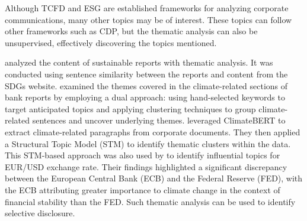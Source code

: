 Although TCFD and ESG are established frameworks for analyzing corporate communications, many other topics may be of interest. These topics can follow other frameworks such as CDP, but the thematic analysis can also be unsupervised, effectively discovering the topics mentioned.

\zeroshot \citet{hyewon_kang_analyzing_2022} analyzed the content of sustainable reports with thematic analysis. It was conducted using sentence similarity between the reports and content from the SDGs website. \citet{yu_climatebug_2024} examined the themes covered in the climate-related sections of bank reports by employing a dual approach: using hand-selected keywords to target anticipated topics and applying clustering techniques to group climate-related sentences and uncover underlying themes.  \citet{bjarne_brie_mandatory_2022} leveraged ClimateBERT to extract climate-related paragraphs from corporate documents. They then applied a Structural Topic Model (STM) \citep{STM} to identify thematic clusters within the data. This STM-based approach was also used by \citet{fortes2020tracking} to identify influential topics for EUR/USD exchange rate.
Their findings highlighted a significant discrepancy between the European Central Bank (ECB) and the Federal Reserve (FED), with the ECB attributing greater importance to climate change in the context of financial stability than the FED. Such thematic analysis can be used to identify selective disclosure.

